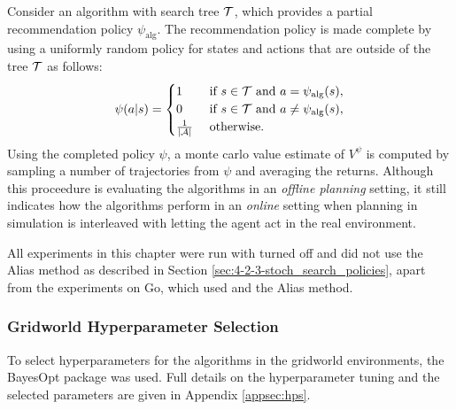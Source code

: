         Consider an algorithm with search tree $\mathcal{T}$, which provides a partial recommendation policy $\psi_{\text{alg}}$. The recommendation policy is made complete by using a uniformly random policy for states and actions that are outside of the tree $\mathcal{T}$ as follows:
        \begin{align}
            \psi(a|s) =
            \begin{cases}
                1                       & \text{ if } s\in\mathcal{T} \text{ and } a=\psi_{\text{alg}}(s), \\
                0                       & \text{ if } s\in\mathcal{T} \text{ and } a\neq\psi_{\text{alg}}(s), \\
                \frac{1}{|\mathcal{A}|}      & \text{ otherwise.}
            \end{cases} \label{eq:full_Recommend}
        \end{align}
        Using the completed policy $\psi$, a monte carlo value estimate of $V^{\psi}$ is computed by sampling a number of trajectories from $\psi$ and averaging the returns.  Although this proceedure is evaluating the algorithms in an \textit{offline planning} setting, it still indicates how the algorithms perform in an \textit{online} setting when planning in simulation is interleaved with letting the agent act in the real environment. 

        All experiments in this chapter were run with \mctsmode\ewe turned off and did not use the Alias method as described in Section \ref{sec:4-2-3-stoch_search_policies}, apart from the experiments on Go, which used \mctsmode and the Alias method.




        \subsubsection{Gridworld Hyperparameter Selection}

            To select hyperparameters for the algorithms in the gridworld environments, the BayesOpt package \cite{martinez2014bayesopt} was used. Full details on the hyperparameter tuning and the selected parameters are given in Appendix \ref{appsec:hps}.

